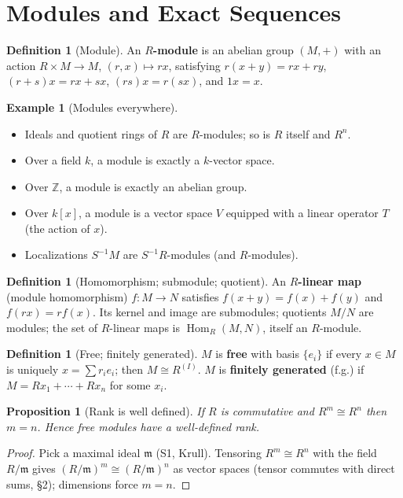 \documentclass[11pt,a4paper]{article}
\newtheorem{proposition}[theorem]{Proposition}
\theoremstyle{definition}
\newtheorem{definition}[theorem]{Definition}
\newtheorem{example}[theorem]{Example}
\newcommand{\Z}{\mathbb{Z}}
\newcommand{\Hom}{\operatorname{Hom}}
\newcommand{\m}{\mathfrak{m}}
\begin{document}
\tableofcontents
\newpage

\section{Modules and Exact Sequences}

\begin{definition}[Module]
An \textbf{$R$-module} is an abelian group $(M,+)$ with an action $R\times M\to M$, $(r,x)\mapsto rx$,
satisfying $r(x+y)=rx+ry$, $(r+s)x=rx+sx$, $(rs)x=r(sx)$, and $1x=x$.
\end{definition}

\begin{example}[Modules everywhere]\label{ex:modules}
\begin{itemize}
  \item Ideals and quotient rings of $R$ are $R$-modules; so is $R$ itself and $R^n$.
  \item Over a field $k$, a module is exactly a $k$-vector space.
  \item Over $\Z$, a module is exactly an abelian group.
  \item Over $k[x]$, a module is a vector space $V$ equipped with a linear operator $T$ (the action of $x$).
  \item Localizations $S^{-1}M$ are $S^{-1}R$-modules (and $R$-modules).
\end{itemize}
\end{example}

\begin{definition}[Homomorphism; submodule; quotient]
An \textbf{$R$-linear map} (module homomorphism) $f:M\to N$ satisfies $f(x+y)=f(x)+f(y)$ and
$f(rx)=rf(x)$. Its kernel and image are submodules; quotients $M/N$ are modules; the set of
$R$-linear maps is $\Hom_R(M,N)$, itself an $R$-module.
\end{definition}

\begin{definition}[Free; finitely generated]
$M$ is \textbf{free} with basis $\{e_i\}$ if every $x\in M$ is uniquely $x=\sum r_i e_i$; then
$M\cong R^{(I)}$. $M$ is \textbf{finitely generated} (f.g.) if $M=R x_1+\cdots+R x_n$ for some $x_i$.
\end{definition}

\begin{proposition}[Rank is well defined]
If $R$ is commutative and $R^m\cong R^n$ then $m=n$. Hence free modules have a well-defined rank.
\end{proposition}
\begin{proof}
Pick a maximal ideal $\m$ (S1, Krull). Tensoring $R^m\cong R^n$ with the field $R/\m$ gives
$(R/\m)^m\cong (R/\m)^n$ as vector spaces (tensor commutes with direct sums, \S2); dimensions force $m=n$.
\end{proof}
\end{document}
